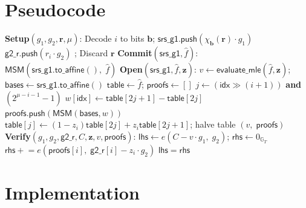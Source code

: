 \section{Pseudocode}

\begin{algorithm}[H]
\caption{MKZG Setup, Commit, Open, Verify}
\label{alg:mkzg-all}
\begin{algorithmic}[1]
\Statex \textbf{Setup}$(g_1, g_2, \mathbf{r}, \mu)$:
    \State Decode $i$ to bits $\mathbf{b}$;\;
           $\mathsf{srs\_g1}.\mathsf{push}(\chi_{\mathbf{b}}(\mathbf{r}) \cdot g_1)$
\EndFor
{}
    \State $\mathsf{g2\_r}.\mathsf{push}(r_i \cdot g_2)$
\EndFor;\; Discard $\mathbf{r}$
\Statex
\Statex \textbf{Commit}$(\mathsf{srs\_g1}, \hat{f})$:
\Return $\mathsf{MSM}(\mathsf{srs\_g1}.\mathsf{to\_affine}(),\; \hat{f})$
\Statex
\Statex \textbf{Open}$(\mathsf{srs\_g1}, \hat{f}, \mathbf{z})$:
\State $v \gets \mathsf{evaluate\_mle}(\hat{f}, \mathbf{z})$;\;
       $\mathsf{bases} \gets \mathsf{srs\_g1}.\mathsf{to\_affine}()$
\State $\mathsf{table} \gets \hat{f}$;\; $\mathsf{proofs} \gets []$
        \State $j \gets (\mathsf{idx} \gg (i+1))$ \textbf{and} $(2^{\mu-i-1}-1)$
        \State $w[\mathsf{idx}] \gets \mathsf{table}[2j+1] - \mathsf{table}[2j]$
    \EndFor
    \State $\mathsf{proofs}.\mathsf{push}(\mathsf{MSM}(\mathsf{bases}, w))$
    \State $\mathsf{table}[j] \gets (1-z_i)\mathsf{table}[2j] + z_i\mathsf{table}[2j+1]$;\;
           halve table
\EndFor
\State \Return $(v,\; \mathsf{proofs})$
\Statex
\Statex \textbf{Verify}$(g_1, g_2, \mathsf{g2\_r}, C, \mathbf{z}, v, \mathsf{proofs})$:
\State $\mathsf{lhs} \gets e(C - v \cdot g_1,\; g_2)$;\;
       $\mathsf{rhs} \gets 0_{\mathbb{G}_T}$
    \State $\mathsf{rhs} \mathrel{+}= e(\mathsf{proofs}[i],\;
           \mathsf{g2\_r}[i] - z_i \cdot g_2)$
\EndFor
\State \Return $\mathsf{lhs} = \mathsf{rhs}$
\end{algorithmic}
\end{algorithm}

\section{Implementation}

